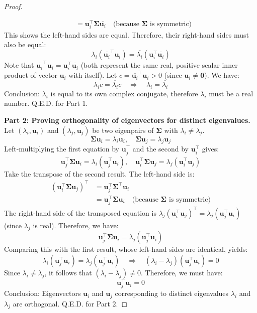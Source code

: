 \documentclass[../main.tex]{subfiles}
\begin{document}
\begin{proof}
\begin{enumerate}
\begin{itemize}
\begin{align*}
        &= \mathbf{u}_i^\top \boldsymbol{\Sigma} \overline{\mathbf{u}_i} \quad \text{(because $\boldsymbol{\Sigma}$ is symmetric)}
        \end{align*}
        This shows the left-hand sides are equal. Therefore, their right-hand sides must also be equal:
        $$
        \lambda_i (\overline{\mathbf{u}_i}^\top \mathbf{u}_i) = \overline{\lambda_i} (\mathbf{u}_i^\top \overline{\mathbf{u}_i})
        $$
        Note that $\overline{\mathbf{u}_i}^\top \mathbf{u}_i = \mathbf{u}_i^\top \overline{\mathbf{u}_i}$ (both represent the same real, positive scalar inner product of vector $\mathbf{u}_i$ with itself). Let $c = \overline{\mathbf{u}_i}^\top \mathbf{u}_i > 0$ (since $\mathbf{u}_i \neq \mathbf{0}$). We have:
        $$
        \lambda_i c = \overline{\lambda_i} c \quad \Rightarrow \quad \lambda_i = \overline{\lambda_i}
        $$
        Conclusion: $\lambda_i$ is equal to its own complex conjugate, therefore $\lambda_i$ must be a real number. Q.E.D. for Part 1.
    \end{itemize}
\end{enumerate}

\noindent\textbf{Part 2: Proving orthogonality of eigenvectors for distinct eigenvalues.}
Let $(\lambda_i, \mathbf{u}_i)$ and $(\lambda_j, \mathbf{u}_j)$ be two eigenpairs of $\boldsymbol{\Sigma}$ with $\lambda_i \neq \lambda_j$.
$$
\boldsymbol{\Sigma} \mathbf{u}_i = \lambda_i \mathbf{u}_i, \quad \boldsymbol{\Sigma} \mathbf{u}_j = \lambda_j \mathbf{u}_j
$$
Left-multiplying the first equation by $\mathbf{u}_j^\top$ and the second by $\mathbf{u}_i^\top$ gives:
$$
\mathbf{u}_j^\top \boldsymbol{\Sigma} \mathbf{u}_i = \lambda_i (\mathbf{u}_j^\top \mathbf{u}_i), \quad \mathbf{u}_i^\top \boldsymbol{\Sigma} \mathbf{u}_j = \lambda_j (\mathbf{u}_i^\top \mathbf{u}_j)
$$
Take the transpose of the second result. The left-hand side is:
\begin{align*}
(\mathbf{u}_i^\top \boldsymbol{\Sigma} \mathbf{u}_j)^\top &= \mathbf{u}_j^\top \boldsymbol{\Sigma}^\top \mathbf{u}_i \\
&= \mathbf{u}_j^\top \boldsymbol{\Sigma} \mathbf{u}_i \quad \text{(because $\boldsymbol{\Sigma}$ is symmetric)}
\end{align*}
The right-hand side of the transposed equation is $\lambda_j (\mathbf{u}_i^\top \mathbf{u}_j)^\top = \lambda_j (\mathbf{u}_j^\top \mathbf{u}_i)$ (since $\lambda_j$ is real). Therefore, we have:
$$
\mathbf{u}_j^\top \boldsymbol{\Sigma} \mathbf{u}_i = \lambda_j (\mathbf{u}_j^\top \mathbf{u}_i)
$$
Comparing this with the first result, whose left-hand sides are identical, yields:
$$
\lambda_i (\mathbf{u}_j^\top \mathbf{u}_i) = \lambda_j (\mathbf{u}_j^\top \mathbf{u}_i) \quad \Rightarrow \quad (\lambda_i - \lambda_j)(\mathbf{u}_j^\top \mathbf{u}_i) = 0
$$
Since $\lambda_i \neq \lambda_j$, it follows that $(\lambda_i - \lambda_j) \neq 0$. Therefore, we must have:
$$
\mathbf{u}_j^\top \mathbf{u}_i = 0
$$
Conclusion: Eigenvectors $\mathbf{u}_i$ and $\mathbf{u}_j$ corresponding to distinct eigenvalues $\lambda_i$ and $\lambda_j$ are orthogonal. Q.E.D. for Part 2.


\end{proof}
\end{document}
